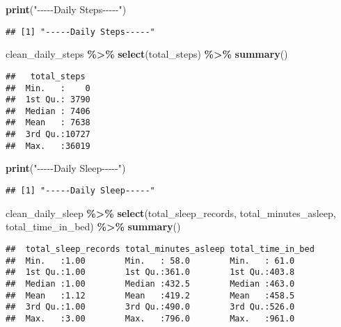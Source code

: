 \documentclass[
]{article}
\newenvironment{Shaded}{\begin{snugshade}}{\end{snugshade}}
\newcommand{\FunctionTok}[1]{\textcolor[rgb]{0.13,0.29,0.53}{\textbf{#1}}}
\newcommand{\NormalTok}[1]{#1}
\newcommand{\SpecialCharTok}[1]{\textcolor[rgb]{0.81,0.36,0.00}{\textbf{#1}}}
\newcommand{\StringTok}[1]{\textcolor[rgb]{0.31,0.60,0.02}{#1}}
\begin{document}
\begin{Shaded}
\begin{Highlighting}[]
\FunctionTok{print}\NormalTok{(}\StringTok{"{-}{-}{-}{-}{-}Daily Steps{-}{-}{-}{-}{-}"}\NormalTok{)}
\end{Highlighting}
\end{Shaded}

\begin{verbatim}
## [1] "-----Daily Steps-----"
\end{verbatim}

\begin{Shaded}
\begin{Highlighting}[]
\NormalTok{clean\_daily\_steps }\SpecialCharTok{\%\textgreater{}\%} 
  \FunctionTok{select}\NormalTok{(total\_steps) }\SpecialCharTok{\%\textgreater{}\%} 
  \FunctionTok{summary}\NormalTok{()}
\end{Highlighting}
\end{Shaded}

\begin{verbatim}
##   total_steps   
##  Min.   :    0  
##  1st Qu.: 3790  
##  Median : 7406  
##  Mean   : 7638  
##  3rd Qu.:10727  
##  Max.   :36019
\end{verbatim}

\begin{Shaded}
\begin{Highlighting}[]
\FunctionTok{print}\NormalTok{(}\StringTok{"{-}{-}{-}{-}{-}Daily Sleep{-}{-}{-}{-}{-}"}\NormalTok{)}
\end{Highlighting}
\end{Shaded}

\begin{verbatim}
## [1] "-----Daily Sleep-----"
\end{verbatim}

\begin{Shaded}
\begin{Highlighting}[]
\NormalTok{clean\_daily\_sleep }\SpecialCharTok{\%\textgreater{}\%} 
  \FunctionTok{select}\NormalTok{(total\_sleep\_records, total\_minutes\_asleep, total\_time\_in\_bed) }\SpecialCharTok{\%\textgreater{}\%} 
  \FunctionTok{summary}\NormalTok{()}
\end{Highlighting}
\end{Shaded}

\begin{verbatim}
##  total_sleep_records total_minutes_asleep total_time_in_bed
##  Min.   :1.00        Min.   : 58.0        Min.   : 61.0    
##  1st Qu.:1.00        1st Qu.:361.0        1st Qu.:403.8    
##  Median :1.00        Median :432.5        Median :463.0    
##  Mean   :1.12        Mean   :419.2        Mean   :458.5    
##  3rd Qu.:1.00        3rd Qu.:490.0        3rd Qu.:526.0    
##  Max.   :3.00        Max.   :796.0        Max.   :961.0
\end{verbatim}
\end{document}
